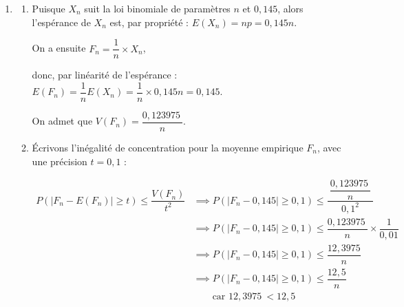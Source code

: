 \documentclass[10pt]{article}
\providecommand{\R}{\mathbb{R}}
\providecommand{\np}[2][]{{#2~#1}}
\begin{document}
\begin{enumerate}
\begin{enumerate}
\item Résolvons, pour $n$ entier naturel :

$\begin{aligned}
p_n \geqslant 0,99
&\iff 1 - 0,855^{n} \geqslant 0,99\\
&\iff  - 0,855^{n} \geqslant -0,01\\
&\iff 0,855^{n} \leqslant 0,01\quad \text{car } -1<0\\
&\iff \ln\left(0,855^{n}\right) \leqslant \ln(0,01) \quad \text{car ln est croissante sur }\R^{*+}\\
	&\iff n\ln\left(0,855\right) \leqslant \ln(0,01)\\
	&\iff n \geqslant \dfrac{\ln(0,01)}{\ln\left(0,855\right)} \quad \text{car } 0,855 <1 \text{ donc }\ln\left(0,855\right) < 0\\
\end{aligned}$

Or $\dfrac{\ln(0,01)}{\ln\left(0,855\right)} \approx 29,4$, donc c'est à partir de $n = 30$ que l'on a une probabilité $p_n$ supérieure ou égale à 0,99.
\end{enumerate}

\item 
	\begin{enumerate}
		\item Puisque $X_n$ suit la loi binomiale de paramètres $n$ et $0,145$, alors l'espérance de $X_n$ est, par propriété : $E(X_n) = np = 0,145n$.

On a ensuite $F_n = \dfrac{1}{n} \times X_n$,

donc, par linéarité de l'espérance : $E(F_n) = \dfrac{1}{n} E(X_n) = \dfrac{1}{n}\times 0,145n = 0,145$.

On admet que $V\left(F_{n}\right)=\dfrac{\np{0,123975}}{n}$.

		\item Écrivons l'inégalité de concentration pour la moyenne empirique $F_n$, avec une précision $t = 0,1$ :

$\begin{aligned}
P\left(\left|F_{n}-E(F_n)\right| \geqslant t\right) \leqslant \dfrac{V(F_n)}{t^2}
	&\implies P\left(\left|F_{n}- 0,145\right| \geqslant 0,1\right) \leqslant \dfrac{~\dfrac{\np{0,123975}}{n}~}{0,1^2}\\
	&\implies P\left(\left|F_{n}-0,145\right| \geqslant 0,1\right) \leqslant \dfrac{\np{0,123975}}{n}\times \dfrac{1}{0,01}\\
	&\implies P\left(\left|F_{n}-0,145\right| \geqslant 0,1\right) \leqslant \dfrac{12,3975}{n}\\
				&\implies P\left(\left|F_{n}-0,145\right| \geqslant 0,1\right) \leqslant \dfrac{12,5}{n}\\
	& \qquad \text{car } \np{12,3975} < 12,5
\end{aligned}$


\end{enumerate}
\end{enumerate}
\end{document}
